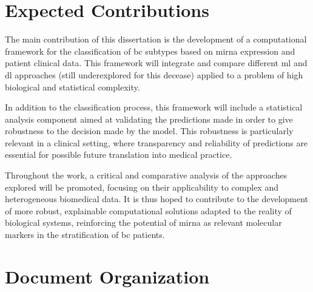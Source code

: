 \section{Expected Contributions}
\label{sec:expected-contributions}
The main contribution of this dissertation is the development of a computational
framework for the classification of \gls{bc} subtypes based on \gls{mirna}
expression and patient clinical data. This framework will integrate
and compare different \gls{ml} and \gls{dl} approaches (still underexplored for this decease)
applied to a problem of high biological and statistical complexity.

In addition to the classification process, this framework will include a
statistical analysis component aimed at validating the predictions made in
order to give robustness to the decision made by the model. This robustness is
particularly relevant in a clinical setting, where transparency and reliability
of predictions are essential for possible future translation into medical
practice.

Throughout the work, a critical and comparative analysis of the approaches
explored will be promoted, focusing on their applicability to complex and
heterogeneous biomedical data. It is thus hoped to contribute to the
development of more robust, explainable computational solutions adapted to the
reality of biological systems, reinforcing the potential of \gls{mirna}
as relevant molecular markers in the stratification of \gls{bc} patients.

\section{Document Organization}
\label{sec:document-organization}
